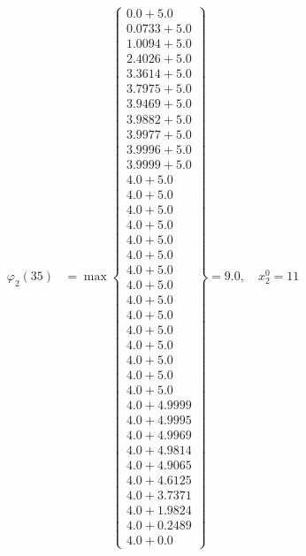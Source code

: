 \documentclass{article}
\begin{document}
\begin{align*}
\varphi_{2}(35) &= \max \left\{ \begin{array}{c}
0.0 + 5.0 \\
 0.0733 + 5.0 \\
 1.0094 + 5.0 \\
 2.4026 + 5.0 \\
 3.3614 + 5.0 \\
 3.7975 + 5.0 \\
 3.9469 + 5.0 \\
 3.9882 + 5.0 \\
 3.9977 + 5.0 \\
 3.9996 + 5.0 \\
 3.9999 + 5.0 \\
 4.0 + 5.0 \\
 4.0 + 5.0 \\
 4.0 + 5.0 \\
 4.0 + 5.0 \\
 4.0 + 5.0 \\
 4.0 + 5.0 \\
 4.0 + 5.0 \\
 4.0 + 5.0 \\
 4.0 + 5.0 \\
 4.0 + 5.0 \\
 4.0 + 5.0 \\
 4.0 + 5.0 \\
 4.0 + 5.0 \\
 4.0 + 5.0 \\
 4.0 + 5.0 \\
 4.0 + 4.9999 \\
 4.0 + 4.9995 \\
 4.0 + 4.9969 \\
 4.0 + 4.9814 \\
 4.0 + 4.9065 \\
 4.0 + 4.6125 \\
 4.0 + 3.7371 \\
 4.0 + 1.9824 \\
 4.0 + 0.2489 \\
 4.0 + 0.0
\end{array} \right\}=9.0, \quad x_{2}^0=11\\
  

\end{align*}
\end{document}
